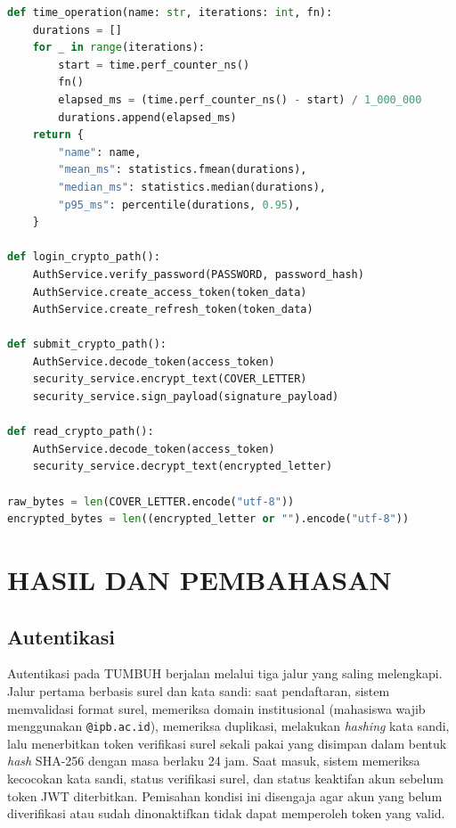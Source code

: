 \documentclass[12pt,a4paper]{article}
\begin{document}
\begin{lstlisting}[language=Python,
  caption={Cuplikan benchmark untuk mengukur overhead login, submit,
           read, dan ukuran data terenkripsi},
  label={lst:benchmark}]
def time_operation(name: str, iterations: int, fn):
    durations = []
    for _ in range(iterations):
        start = time.perf_counter_ns()
        fn()
        elapsed_ms = (time.perf_counter_ns() - start) / 1_000_000
        durations.append(elapsed_ms)
    return {
        "name": name,
        "mean_ms": statistics.fmean(durations),
        "median_ms": statistics.median(durations),
        "p95_ms": percentile(durations, 0.95),
    }

def login_crypto_path():
    AuthService.verify_password(PASSWORD, password_hash)
    AuthService.create_access_token(token_data)
    AuthService.create_refresh_token(token_data)

def submit_crypto_path():
    AuthService.decode_token(access_token)
    security_service.encrypt_text(COVER_LETTER)
    security_service.sign_payload(signature_payload)

def read_crypto_path():
    AuthService.decode_token(access_token)
    security_service.decrypt_text(encrypted_letter)

raw_bytes = len(COVER_LETTER.encode("utf-8"))
encrypted_bytes = len((encrypted_letter or "").encode("utf-8"))
\end{lstlisting}

\section{HASIL DAN PEMBAHASAN}

\subsection{Autentikasi}

Autentikasi pada TUMBUH berjalan melalui tiga jalur yang saling
melengkapi. Jalur pertama berbasis surel dan kata sandi: saat
pendaftaran, sistem memvalidasi format surel, memeriksa domain
institusional (mahasiswa wajib menggunakan \texttt{@ipb.ac.id}),
memeriksa duplikasi, melakukan \textit{hashing} kata sandi, lalu
menerbitkan token verifikasi surel sekali pakai yang disimpan dalam
bentuk \textit{hash} SHA-256 dengan masa berlaku 24 jam. Saat masuk,
sistem memeriksa kecocokan kata sandi, status verifikasi surel, dan
status keaktifan akun sebelum token JWT diterbitkan. Pemisahan kondisi
ini disengaja agar akun yang belum diverifikasi atau sudah dinonaktifkan
tidak dapat memperoleh token yang valid.
\end{document}
